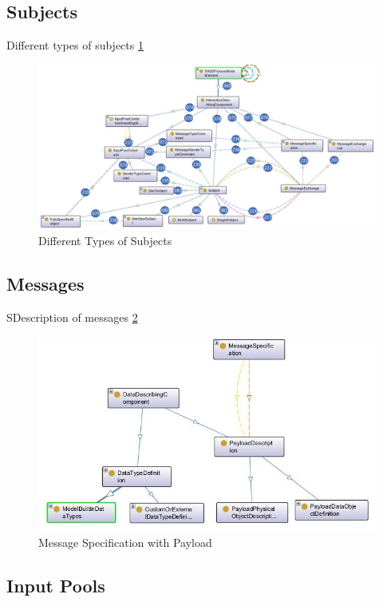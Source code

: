 \subsection{Subjects}

Different types of subjects \ref{fig:20181205-subject}
\begin{figure}[ph]
	\centering
	\includegraphics[width=0.9\linewidth]{20181026-Ontologie-Bilder/Grafiken-Ontologie/SUbject-Interaction/20181205-Subject}
	\caption[Subject]{Different Types of Subjects}
	\label{fig:20181205-subject}
\end{figure}

\newpage

\subsection{Messages}

SDescription of messages \ref{fig:20181205-datatypes-payload}

\begin{figure}[ph]
	\centering
	\includegraphics[width=0.7\linewidth]{20181026-Ontologie-Bilder/Grafiken-Ontologie/SUbject-Interaction/20181205-Datatypes-Payload}
	\caption[Message specification]{Message Specification with Payload}
	\label{fig:20181205-datatypes-payload}
\end{figure}

\newpage

\subsection{Input Pools}

